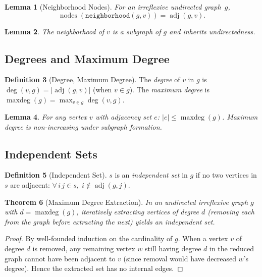 \documentclass[11pt]{article}
\theoremstyle{plain}
\newtheorem{theorem}{Theorem}[section]
\newtheorem{lemma}[theorem]{Lemma}
\theoremstyle{definition}
\newtheorem{definition}[theorem]{Definition}
\theoremstyle{remark}
\newcommand{\adj}{\operatorname{adj}}
\newcommand{\nodes}{\operatorname{nodes}}
\newcommand{\degree}{\operatorname{deg}}
\newcommand{\maxdeg}{\operatorname{maxdeg}}
\begin{document}
\begin{lemma}[Neighborhood Nodes]
\label{lem:nbd-nodes}
For an irreflexive undirected graph~$g$,
\[
  \nodes(\texttt{neighborhood}(g, v)) = \adj(g, v).
\]
\end{lemma}

\begin{lemma}
The neighborhood of $v$ is a subgraph of $g$ and inherits undirectedness.
\end{lemma}

\subsection{Degrees and Maximum Degree}

\begin{definition}[Degree, Maximum Degree]
The \emph{degree} of $v$ in $g$ is $\degree(v, g) = |\adj(g,v)|$ (when $v \in g$). The \emph{maximum degree} is $\maxdeg(g) = \max_{v \in g} \degree(v, g)$.
\end{definition}

\begin{lemma}
For any vertex $v$ with adjacency set $e$: $|e| \le \maxdeg(g)$. Maximum degree is non-increasing under subgraph formation.
\end{lemma}

\subsection{Independent Sets}

\begin{definition}[Independent Set]
$s$ is an \emph{independent set} in $g$ if no two vertices in $s$ are adjacent: $\forall\, i\, j \in s,\; i \notin \adj(g, j)$.
\end{definition}

\begin{theorem}[Maximum Degree Extraction]
\label{thm:max-deg-extraction}
In an undirected irreflexive graph $g$ with $d = \maxdeg(g)$, iteratively extracting vertices of degree $d$ (removing each from the graph before extracting the next) yields an independent set.
\end{theorem}

\begin{proof}
By well-founded induction on the cardinality of $g$. When a vertex $v$ of degree $d$ is removed, any remaining vertex $w$ still having degree $d$ in the reduced graph cannot have been adjacent to $v$ (since removal would have decreased $w$'s degree). Hence the extracted set has no internal edges.
\end{proof}
\end{document}

